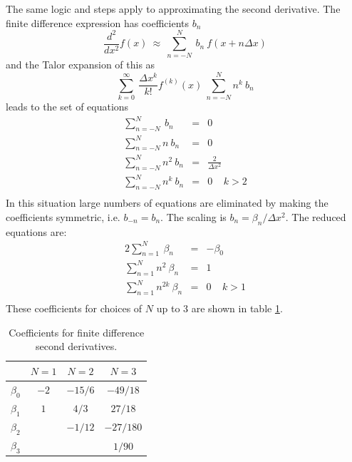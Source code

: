 \documentclass{article}
\def\dx{\Delta x}
\def\dx{\Delta x}
\begin{document}
The same logic and steps apply to approximating the second derivative.  The finite difference expression has coefficients $b_n$
\begin{equation}
\frac{d^2}{dx^2}f(x)\ \approx\ \sum_{n=-N}^{N}\ b_n\ f(x+n\dx)
\end{equation}
and the Talor expansion of this as
\begin{equation}
\sum_{k=0}^{\infty} \ \frac{\dx^k}{k!} f^{(k)}(x) \ \sum_{n=-N}^{N} n^k\ b_n
\end{equation}
leads to the set of equations
\begin{eqnarray}
\sum_{n=-N}^{N} \ b_n &=& 0 \\
\sum_{n=-N}^{N} n\ b_n &=& 0 \\
\sum_{n=-N}^{N} n^2\ b_n &=& \frac{2}{\dx^2} \\
\sum_{n=-N}^{N} n^k\ b_n &=& 0\ \ \ \ \ k>2 \\
\end{eqnarray}
In this situation large numbers of equations are eliminated by making the coefficients symmetric, i.e. $b_{-n}=b_n$.  The scaling is $b_n=\beta_n/\dx^2$.  The reduced equations are:
\begin{eqnarray}
2\sum_{n=1}^{N} \ \beta_n &=& -\beta_0\\
\sum_{n=1}^{N} n^2\ \beta_n &=& 1 \\
\sum_{n=1}^{N} n^{2k}\ \beta_n &=& 0\ \ \ \ \ k>1 \\
\end{eqnarray}
These coefficients for choices of $N$ up to 3 are shown in table \ref{secondcoefficients}.
\begin{table}
\begin{center}
\begin{tabular}{|c|c|c|c|}\hline
          & $N=1$ & $N=2$   & $N=3$ \\ \hline
$\beta_0$ & $-2$&  $-15/6$  &  $-49/18$     \\ \hline
$\beta_1$ & $1$ &  $4/3$    &  $27/18$     \\ \hline
$\beta_2$ &     &  $-1/12$  &  $-27/180$   \\ \hline
$\beta_3$ &     &           &  $1/90$      \\ \hline
\end{tabular}
\end{center}
\caption{Coefficients for finite difference second derivatives.}\label{secondcoefficients}
\end{table}
\end{document}
